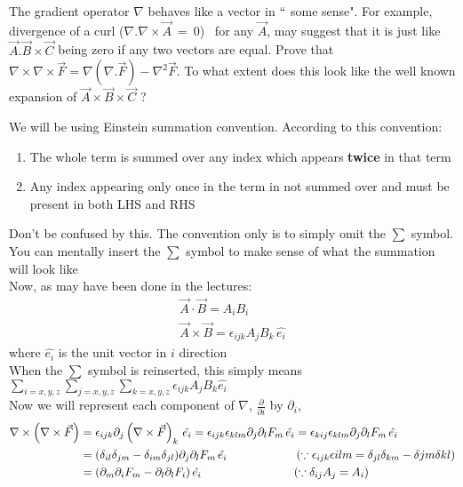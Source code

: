 \documentclass[../main.tex]{subfiles}
\begin{document}
\begin{questions}
\question The gradient operator $\nabla $ behaves like a vector in $\lq\lq$ some sense". For example, divergence of a curl ($\nabla.\nabla\times\vec{A}~=~0$)~ for any $\vec{A}$, may suggest that it is just like $\vec{A}.\vec{B}\times\vec{C}$  being zero if any two vectors are equal. Prove that $\nabla\times\nabla\times{\vec{F}} = \nabla(\nabla.\vec{F}) - \nabla^2{\vec{F}}$. To what extent does this look like the well known expansion of  $\vec{A}\times\vec{B}\times\vec{C}$ ?
\begin{solution}
	We will be using Einstein summation convention. According to this convention:
	\begin{enumerate}
		\item The whole term is summed over any index which appears \textbf{twice} in that term
		\item Any index appearing only once in the term in not summed over and must be present in both LHS and RHS
	\end{enumerate}
	Don't be confused by this. The convention only is to simply omit the $\sum$ symbol. You can mentally insert the $\sum$ symbol to make sense of what the summation will look like \\
	Now, as may have been done in the lectures:
	\begin{gather}
		\vec{A}\cdot\vec{B} = A_iB_i \\
		\vec{A}\times\vec{B} = \epsilon_{ijk}A_jB_k\,\hat{e_i}
	\end{gather}
	where $\hat{e_i}$ is the unit vector in $i$ direction \\
	When the $\sum$ symbol is reinserted, this simply means $\sum\limits_{i=x,y,z}\sum\limits_{j=x,y,z}\sum\limits_{k=x,y,z}\epsilon_{ijk}A_jB_k\hat{e_i}$ \\
	Now we will represent each component of $\nabla$, $\frac{\partial}{\partial i}$ by $\partial_i$,
	\begin{align}
		\nabla \times \left( \nabla \times \vec{F} \right) &= \epsilon_{ijk}\partial_j\left(\nabla\times\vec{F}\right)_k\,\hat{e_i} = \epsilon_{ijk}\epsilon_{klm}\partial_j\partial_lF_m\,\hat{e_i} = \epsilon_{kij}\epsilon_{klm}\partial_j\partial_lF_m\,\hat{e_i}\\
		&= (\delta_{il}\delta_{jm}-\delta_{im}\delta_{jl})\partial_j\partial_lF_m\,\hat{e_i} \text{\,\,\,\,\,\,\,\,\,\,\,\,\,\,\,\,\,\,\,\,\,\,\,\,\,\,\,\,\,\,\,\,\,\,\,\,($\because \epsilon_{ijk}\epsilon{ilm} = \delta_{jl}\delta_{km} - \delta{jm}\delta{kl}$)} \\
		&= (\partial_m\partial_iF_m - \partial_l\partial_lF_i)\,\hat{e_i} \text{\,\,\,\,\,\,\,\,\,\,\,\,\,\,\,\,\,\,\,\,\,\,\,\,\,\,\,\,\,\,\,\,\,\,\,\,\,\,\,\,\,\,\,\,\,\,\,\,($\because \delta_{ij}A_j = A_i$)}\\

\end{align}
\end{solution}
\end{questions}
\end{document}
